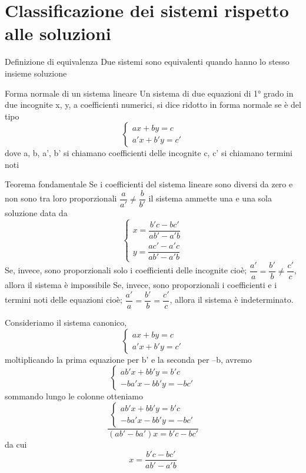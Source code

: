 \section[Classificazione rispetto alle soluzioni]{Classificazione dei sistemi rispetto alle soluzioni}
\begin{definizionet}{Definizione di equivalenza}{}
Due sistemi sono equivalenti quando hanno lo stesso insieme soluzione
\end{definizionet}
\begin{definizionet}{Forma normale di un sistema lineare}{}
Un sistema di due equazioni di 1° grado in due incognite x, y, a coefficienti numerici, si dice ridotto in forma normale se è del tipo
\[\left\{\begin{array}{l} {ax+by=c} \\ {a'x+b'y=c'}\end{array}\right. \]
dove a, b, a', b' si chiamano coefficienti delle incognite c, c' si chiamano termini noti
\end{definizionet}
\begin{teoremat}{Teorema fondamentale}{}
Se i coefficienti del sistema lineare sono diversi da zero e non sono tra loro proporzionali $\dfrac{a}{a'} \ne \dfrac{b}{b'}$ il sistema ammette una e una sola soluzione data da
\[
\begin{cases}
	x=\dfrac{b'c-bc'}{ab'-a'b}\\
	y=\dfrac{ac'-a'c}{ab'-a'b}
\end{cases}
\]
Se, invece, sono proporzionali solo i coefficienti delle incognite cioè; $\dfrac{a'}{a} =\dfrac{b'}{b} \ne \dfrac{c'}{c} $, allora il sistema è impossibile
Se, invece, sono proporzionali i coefficienti e i termini noti delle equazioni cioè; $\dfrac{a'}{a} =\dfrac{b'}{b} =\dfrac{c'}{c} $, allora il sistema è indeterminato.
\end{teoremat}
Consideriamo il sistema canonico, \[ \left\{\begin{array}{l} {ax+by=c} \\ {a'x+b'y=c'} \end{array}\right. \]
moltiplicando la prima equazione per b' e la seconda per --b, avremo  \[\left\{\begin{array}{l} {ab'x+bb'y=b'c} \\ {-ba'x-bb'y=-bc'} \end{array}\right. \]
sommando lungo le colonne otteniamo \[\dfrac{\left\{\begin{array}{l} {ab'x+bb'y=b'c} \\ {-ba'x-bb'y=-bc'} \end{array}\right. }{\left(ab'-ba'\right)x=b'c-bc'} \]  da cui  \[x=\dfrac{b'c-bc'}{ab'-a'b} \]
